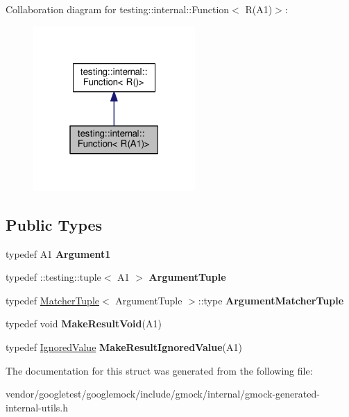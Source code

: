 Collaboration diagram for testing\+:\+:internal\+:\+:Function$<$ R(A1)$>$\+:\nopagebreak
\begin{figure}[H]
\begin{center}
\leavevmode
\includegraphics[width=175pt]{structtesting_1_1internal_1_1Function_3_01R_07A1_08_4__coll__graph}
\end{center}
\end{figure}
\subsection*{Public Types}
\begin{DoxyCompactItemize}
\item 
typedef A1 {\bfseries Argument1}\hypertarget{structtesting_1_1internal_1_1Function_3_01R_07A1_08_4_aca36c8586218fd015cc4736dc8d4c14f}{}\label{structtesting_1_1internal_1_1Function_3_01R_07A1_08_4_aca36c8586218fd015cc4736dc8d4c14f}

\item 
typedef \+::testing\+::tuple$<$ A1 $>$ {\bfseries Argument\+Tuple}\hypertarget{structtesting_1_1internal_1_1Function_3_01R_07A1_08_4_afd48881a58d72658e547a170fb0f2087}{}\label{structtesting_1_1internal_1_1Function_3_01R_07A1_08_4_afd48881a58d72658e547a170fb0f2087}

\item 
typedef \hyperlink{structtesting_1_1internal_1_1MatcherTuple}{Matcher\+Tuple}$<$ Argument\+Tuple $>$\+::type {\bfseries Argument\+Matcher\+Tuple}\hypertarget{structtesting_1_1internal_1_1Function_3_01R_07A1_08_4_a0e35671ae43c3d3310893e1d6d895d06}{}\label{structtesting_1_1internal_1_1Function_3_01R_07A1_08_4_a0e35671ae43c3d3310893e1d6d895d06}

\item 
typedef void {\bfseries Make\+Result\+Void}(A1)\hypertarget{structtesting_1_1internal_1_1Function_3_01R_07A1_08_4_aab10495172953eb51fc3940c4c1e890a}{}\label{structtesting_1_1internal_1_1Function_3_01R_07A1_08_4_aab10495172953eb51fc3940c4c1e890a}

\item 
typedef \hyperlink{classtesting_1_1internal_1_1IgnoredValue}{Ignored\+Value} {\bfseries Make\+Result\+Ignored\+Value}(A1)\hypertarget{structtesting_1_1internal_1_1Function_3_01R_07A1_08_4_a8fa56b9e05cb029ec7c8415ee352f865}{}\label{structtesting_1_1internal_1_1Function_3_01R_07A1_08_4_a8fa56b9e05cb029ec7c8415ee352f865}

\end{DoxyCompactItemize}


The documentation for this struct was generated from the following file\+:\begin{DoxyCompactItemize}
\item 
vendor/googletest/googlemock/include/gmock/internal/gmock-\/generated-\/internal-\/utils.\+h\end{DoxyCompactItemize}
